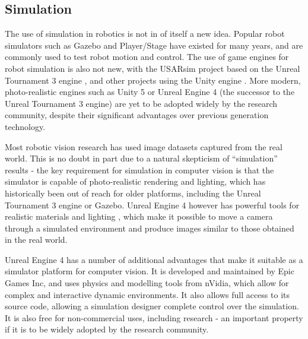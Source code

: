 
\subsection{Simulation}

The use of simulation in robotics is not in of itself a new idea. Popular robot simulators such as Gazebo \cite{Koenig2004} and Player/Stage \cite{Gerkey2003} have existed for many years, and are commonly used to test robot motion and control. The use of game engines for robot simulation is also not new, with the USARsim project based on the Unreal Tournament 3 engine \cite{Carpin2007}, and other projects using the Unity engine \cite{mattingly2012robot}. More modern, photo-realistic engines such as Unity 5 or Unreal Engine 4 (the successor to the Unreal Tournament 3 engine) are yet to be adopted widely by the research community, despite their significant advantages over previous generation technology.

Most robotic vision research has used image datasets captured from the real world. This is no doubt in part due to a natural skepticism of "`simulation"' results - the key requirement for simulation in computer vision is that the simulator is capable of photo-realistic rendering and lighting, which has historically been out of reach for older platforms, including the Unreal Tournament 3 engine or Gazebo. Unreal Engine 4 however has powerful tools for realistic materials and lighting \cite{karis2013real}, which make it possible to move a camera through a simulated environment and produce images similar to those obtained in the real world.

Unreal Engine 4 has a number of additional advantages that make it suitable as a simulator platform for computer vision. It is developed and maintained by Epic Games Inc, and uses physics and modelling tools from nVidia, which allow for complex and interactive dynamic environments. It also allows full access to its source code, allowing a simulation designer complete control over the simulation. It is also free for non-commercial uses, including research - an important property if it is to be widely adopted by the research community.

